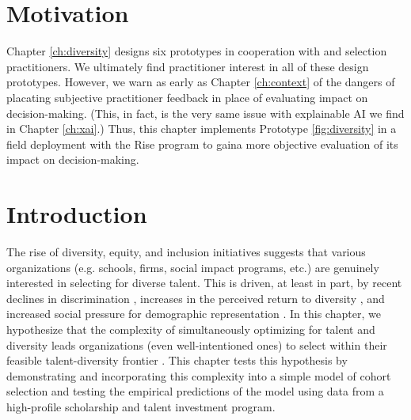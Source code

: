 

\section{Motivation}
Chapter \ref{ch:diversity} designs six prototypes in cooperation with \rise and \eit selection practitioners. We ultimately find practitioner interest in all of these design prototypes. However, we warn as early as Chapter \ref{ch:context} of the dangers of placating subjective practitioner feedback in place of evaluating impact on decision-making. (This, in fact, is the very same issue with explainable AI we find in Chapter \ref{ch:xai}.) Thus, this chapter implements Prototype \ref{fig:diversity} in a field deployment with the Rise program to gaina more objective evaluation of its impact on decision-making.

\section{Introduction}\label{sec:spfintro}
The rise of diversity, equity, and inclusion initiatives suggests that various organizations (e.g. schools, firms, social impact programs, etc.) are genuinely interested in selecting for diverse talent. This is driven, at least in part, by recent declines in discrimination \cite{hsieh2019allocation}, increases in the perceived return to diversity \cite{deming2017growing, page_diversity_2017, noray2023systemic}, and increased social pressure for demographic representation \cite{minkin2023diversity}. In this chapter, we hypothesize that the complexity of simultaneously optimizing for talent and diversity leads organizations (even well-intentioned ones) to select within their feasible talent-diversity frontier \cite{nemhauser1978analysis, huppenkothen2020entrofy}. This chapter tests this hypothesis by demonstrating and incorporating this complexity into a simple model of cohort selection and testing the empirical predictions of the model using data from a high-profile scholarship and talent investment program. 

